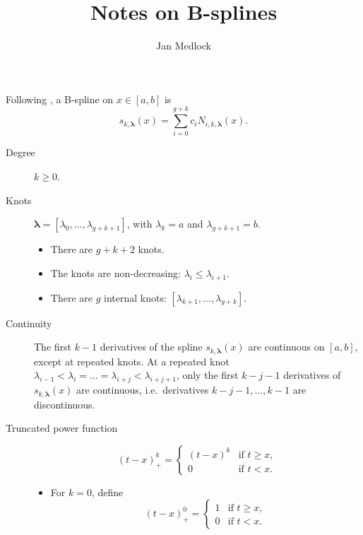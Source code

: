 \documentclass{article}
\title{Notes on B-splines}
\author{Jan Medlock}
\renewcommand{\vec}[1]{\bm{#1}}
\begin{document}
\maketitle

Following \textcite{Dierckx_1993}, a B-spline on $x \in [a, b]$ is
\begin{equation}
  s_{k, \vec{\lambda}}(x)
  = \sum_{i=0}^{g+k} c_i N_{i, k, \vec{\lambda}}(x).
\end{equation}

\begin{description}
\item [Degree] $k \geq 0$.

\item [Knots]
  $\vec{\lambda} = [\lambda_0, \ldots, \lambda_{g+k+1}]$,
  with $\lambda_k = a$ and $\lambda_{g+k+1} = b$.

  \begin{itemize}
  \item There are $g + k + 2$ knots.

  \item The knots are non-decreasing:
    $\lambda_i \leq \lambda_{i+1}$.

  \item There are $g$ internal knots:
    $[\lambda_{k+1}, \ldots, \lambda_{g+k}]$.

  \end{itemize}

\item[Continuity] The first $k - 1$ derivatives of the spline
  $s_{k, \vec{\lambda}}(x)$ are continuous on $[a, b]$, except at
  repeated knots.  At a repeated knot
  $\lambda_{i - 1}
  < \lambda_i = \ldots = \lambda_{i + j}
  < \lambda_{i + j + 1}$,
  only the first $k - j - 1$ derivatives of
  $s_{k, \vec{\lambda}}(x)$
  are continuous, i.e.~derivatives
  $k - j - 1, \ldots, k - 1$
  are discontinuous.

\item[Truncated power function]
  \begin{equation}
    (t - x)_+^k
    =
    \begin{cases}
      (t - x)^k & \text{if $t \geq x$},
      \\
      0 & \text{if $t < x$}.
    \end{cases}
  \end{equation}

  \begin{itemize}
  \item For $k = 0$, define
    \begin{equation}
      (t - x)_+^0
      =
      \begin{cases}
        1 & \text{if $t \geq x$},
        \\
        0 & \text{if $t < x$}.
      \end{cases}
    \end{equation}


\end{itemize}
\end{description}
\end{document}
